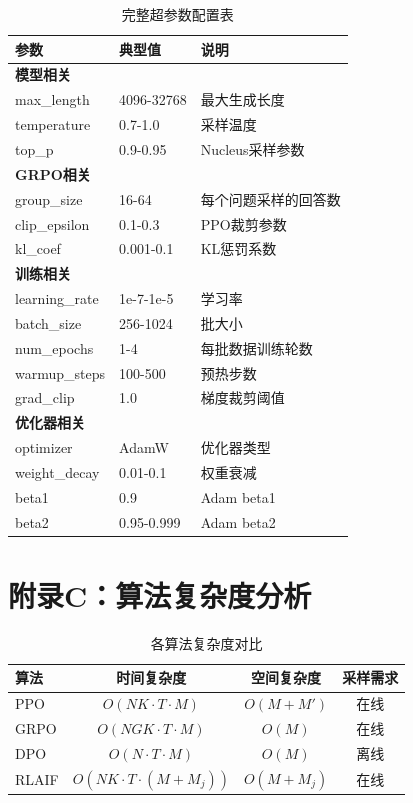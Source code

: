\documentclass[12pt,a4paper]{article}
\begin{document}
\begin{table}[H]
\centering
\caption{完整超参数配置表}
\begin{tabular}{llp{6cm}}
\toprule
\textbf{参数} & \textbf{典型值} & \textbf{说明} \\
\midrule
\multicolumn{3}{l}{\textbf{模型相关}} \\
max\_length & 4096-32768 & 最大生成长度 \\
temperature & 0.7-1.0 & 采样温度 \\
top\_p & 0.9-0.95 & Nucleus采样参数 \\
\midrule
\multicolumn{3}{l}{\textbf{GRPO相关}} \\
group\_size & 16-64 & 每个问题采样的回答数 \\
clip\_epsilon & 0.1-0.3 & PPO裁剪参数 \\
kl\_coef & 0.001-0.1 & KL惩罚系数 \\
\midrule
\multicolumn{3}{l}{\textbf{训练相关}} \\
learning\_rate & 1e-7-1e-5 & 学习率 \\
batch\_size & 256-1024 & 批大小 \\
num\_epochs & 1-4 & 每批数据训练轮数 \\
warmup\_steps & 100-500 & 预热步数 \\
grad\_clip & 1.0 & 梯度裁剪阈值 \\
\midrule
\multicolumn{3}{l}{\textbf{优化器相关}} \\
optimizer & AdamW & 优化器类型 \\
weight\_decay & 0.01-0.1 & 权重衰减 \\
beta1 & 0.9 & Adam beta1 \\
beta2 & 0.95-0.999 & Adam beta2 \\
\bottomrule
\end{tabular}
\end{table}

\section*{附录C：算法复杂度分析}

\begin{table}[H]
\centering
\caption{各算法复杂度对比}
\begin{tabular}{lccc}
\toprule
\textbf{算法} & \textbf{时间复杂度} & \textbf{空间复杂度} & \textbf{采样需求} \\
\midrule
PPO & $O(NK \cdot T \cdot M)$ & $O(M + M')$ & 在线 \\
GRPO & $O(NGK \cdot T \cdot M)$ & $O(M)$ & 在线 \\
DPO & $O(N \cdot T \cdot M)$ & $O(M)$ & 离线 \\
RLAIF & $O(NK \cdot T \cdot (M + M_j))$ & $O(M + M_j)$ & 在线 \\
\bottomrule
\end{tabular}
\end{table}
\end{document}
